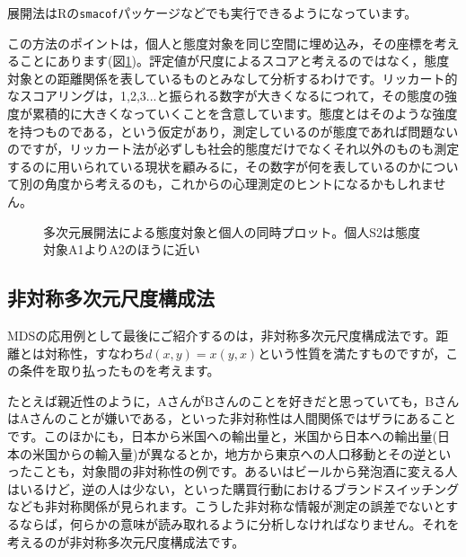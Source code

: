 \documentclass{ltjsbook}
\begin{document}
展開法はRの\verb|smacof|パッケージなどでも実行できるようになっています。

この方法のポイントは，個人と態度対象を同じ空間に埋め込み，その座標を考えることにあります(図\ref{Unfolding2})。評定値が尺度によるスコアと考えるのではなく，態度対象との距離関係を表しているものとみなして分析するわけです。リッカート的なスコアリングは，1,2,3...と振られる数字が大きくなるにつれて，その態度の強度が累積的に大きくなっていくことを含意しています。態度とはそのような強度を持つものである，という仮定があり，測定しているのが態度であれば問題ないのですが，リッカート法が必ずしも社会的態度だけでなくそれ以外のものも測定するのに用いられている現状を顧みるに，その数字が何を表しているのかについて別の角度から考えるのも，これからの心理測定のヒントになるかもしれません。
\begin{figure}[ht]
	\begin{center}
		\caption{多次元展開法による態度対象と個人の同時プロット。個人S2は態度対象A1よりA2のほうに近い}
		\label{Unfolding2}
	\end{center}
\end{figure}
\subsection{非対称多次元尺度構成法}
MDSの応用例として最後にご紹介するのは，非対称多次元尺度構成法です。距離とは対称性，すなわち$d(x,y)=x(y,x)$という性質を満たすものですが，この条件を取り払ったものを考えます。

たとえば親近性のように，AさんがBさんのことを好きだと思っていても，BさんはAさんのことが嫌いである，といった非対称性は人間関係ではザラにあることです。このほかにも，日本から米国への輸出量と，米国から日本への輸出量(日本の米国からの輸入量)が異なるとか，地方から東京への人口移動とその逆といったことも，対象間の非対称性の例です。あるいはビールから発泡酒に変える人はいるけど，逆の人は少ない，といった購買行動におけるブランドスイッチングなども非対称関係が見られます。こうした非対称な情報が測定の誤差でないとするならば，何らかの意味が読み取れるように分析しなければなりません。それを考えるのが非対称多次元尺度構成法です。
\end{document}
